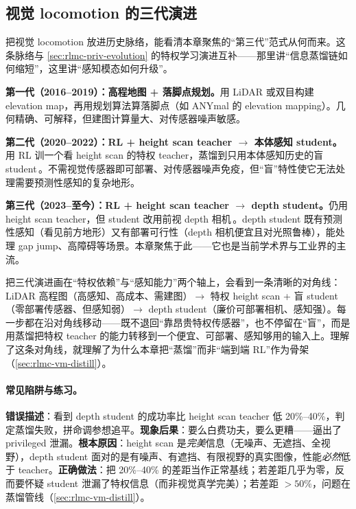 \subsection{视觉 locomotion 的三代演进}
\label{sec:rlmc-vm-evolution}

把视觉 locomotion 放进历史脉络，能看清本章聚焦的“第三代”范式从何而来。这条脉络与 \cref{sec:rlmc-priv-evolution} 的特权学习演进互补——那里讲“信息蒸馏链如何缩短”，这里讲“感知模态如何升级”。

\textbf{第一代（2016--2019）：高程地图 + 落脚点规划。}用 LiDAR 或双目构建 elevation map，再用规划算法算落脚点（如 ANYmal 的 elevation mapping）。几何精确、可解释，但建图计算量大、对传感器噪声敏感。

\textbf{第二代（2020--2022）：RL + height scan teacher $\to$ 本体感知 student。}用 RL 训一个看 height scan 的特权 teacher，蒸馏到只用本体感知历史的盲 student\,\cite{lee2020quadruped,kumar2021rma}。不需视觉传感器即可部署、对传感器噪声免疫，但“盲”特性使它无法处理需要预测性感知的复杂地形。

\textbf{第三代（2023--至今）：RL + height scan teacher $\to$ depth student。}仍用 height scan teacher，但 student 改用前视 depth 相机\,\cite{agarwal2023legged,cheng2024parkour}。depth student 既有预测性感知（看见前方地形）又有部署可行性（depth 相机便宜且对光照鲁棒），能处理 gap jump、高障碍等场景。本章聚焦于此——它也是当前学术界与工业界的主流。

\begin{insight}\label{ins:rlmc-vm-twoaxis}
把三代演进画在“特权依赖”与“感知能力”两个轴上，会看到一条清晰的对角线：LiDAR 高程图（高感知、高成本、需建图）$\to$ 特权 height scan + 盲 student（零部署传感器、但感知弱）$\to$ depth student（廉价可部署相机、感知强）。每一步都在沿对角线移动——既不退回“靠昂贵特权传感器”，也不停留在“盲”，而是用蒸馏把特权 teacher 的能力转移到一个便宜、可部署、感知够用的输入上。理解了这条对角线，就理解了为什么本章把“蒸馏”而非“端到端 RL”作为骨架（\cref{sec:rlmc-vm-distill}）。
\end{insight}

\paragraph{常见陷阱与练习。}

\begin{pitfall}
\textbf{错误描述}：看到 depth student 的成功率比 height scan teacher 低 20\%--40\%，判定蒸馏失败，拼命调参想追平。\textbf{现象后果}：要么白费功夫，要么更糟——逼出了 privileged 泄漏。\textbf{根本原因}：height scan 是\emph{完美}信息（无噪声、无遮挡、全视野），depth student 面对的是有噪声、有遮挡、有限视野的真实图像，性能\emph{必然}低于 teacher。\textbf{正确做法}：把 20\%--40\% 的差距当作正常基线；若差距几乎为零，反而要怀疑 student 泄漏了特权信息（而非视觉真学完美）；若差距 $>50\%$，问题在蒸馏管线（\cref{sec:rlmc-vm-distill}）。
\end{pitfall}

